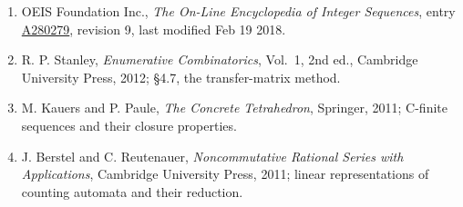 \documentclass[11pt]{article}
\theoremstyle{definition}
\begin{document}
\begin{enumerate}

\item OEIS Foundation Inc., \emph{The On-Line Encyclopedia of Integer Sequences}, entry \href{https://oeis.org/A280279}{A280279}, revision 9, last modified Feb 19 2018.

\item R. P. Stanley, \emph{Enumerative Combinatorics}, Vol.~1, 2nd ed., Cambridge University Press, 2012; \S4.7, the transfer-matrix method.

\item M. Kauers and P. Paule, \emph{The Concrete Tetrahedron}, Springer, 2011; C-finite sequences and their closure properties.

\item J. Berstel and C. Reutenauer, \emph{Noncommutative Rational Series with Applications}, Cambridge University Press, 2011; linear representations of counting automata and their reduction.

\end{enumerate}
\end{document}
